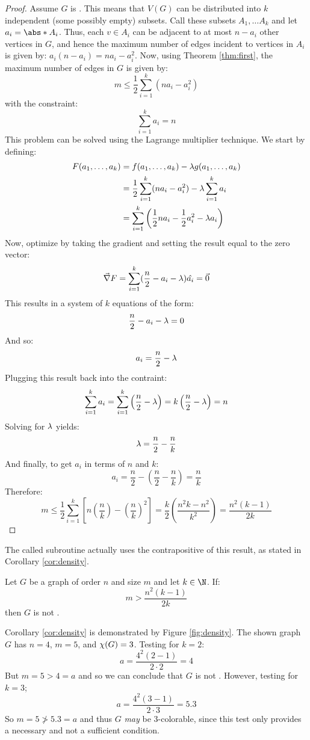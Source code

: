 \begin{proof}
  Assume \(G\) is .  This means that \(V(G)\) can be distributed into \(k\) independent (some possibly
  empty) subsets.  Call these subsets \(A_1,\ldots A_k\) and let \(a_i=\abs*{A_i}\).  Thus, each \(v\in A_i\) can
  be adjacent to at most \(n-a_i\) other vertices in \(G\), and hence the maximum number of edges incident to
  vertices in \(A_i\) is given by: \(a_i(n-a_i)=na_i-a_i^2\).  Now, using Theorem \ref{thm:first}, the maximum
  number of edges in \(G\) is given by:
  \[m\le\frac{1}{2}\sum_{i=1}^k(na_i-a_i^2)\]
  with the constraint:
  \[\sum_{i=1}^ka_i=n\]
  This problem can be solved using the Lagrange multiplier technique.  We start by defining:
  \begin{align*}
    F(a_1,\ldots,a_k) &= f(a_1,\ldots,a_k)-\lambda g(a_1,\ldots,a_k) \\
    &= \frac{1}{2}\sum_{i=1}^k(na_i-a_i^2)-\lambda\sum_{i=1}^ka_i \\
    &= \sum_{i=1}^k\left(\frac{1}{2}na_i-\frac{1}{2}a_i^2-\lambda a_i\right)
  \end{align*}
  Now, optimize by taking the gradient and setting the result equal to the zero vector:
  \[\vec{\nabla}F=\sum_{i=1}^k(\frac{n}{2}-a_i-\lambda)\hat{a_i}=\vec{0}\]
  This results in a system of \(k\) equations of the form:
  \[\frac{n}{2}-a_i-\lambda=0\]
  And so:
  \[a_i=\frac{n}{2}-\lambda\]
  Plugging this result back into the contraint:
  \[\sum_{i=1}^ka_i=\sum_{i=1}^k\left(\frac{n}{2}-\lambda\right)=k\left(\frac{n}{2}-\lambda\right)=n\]
  Solving for \(\lambda\) yields:
  \[\lambda=\frac{n}{2}-\frac{n}{k}\]
  And finally, to get \(a_i\) in terms of \(n\) and \(k\):
  \[a_i=\frac{n}{2}-\left(\frac{n}{2}-\frac{n}{k}\right)=\frac{n}{k}\]
  Therefore:
  \[m\le\frac{1}{2}\sum_{i=1}^k\left[n\left(\frac{n}{k}\right)-\left(\frac{n}{k}\right)^2\right]=
  \frac{k}{2}\left(\frac{n^2k-n^2}{k^2}\right)=\frac{n^2(k-1)}{2k}\]
\end{proof}

The called subroutine actually uses the contrapositive of this result, as stated in Corollary \ref{cor:density}.

\begin{corollary}
  \label{cor:density}
  Let \(G\) be a graph of order \(n\) and size \(m\) and let \(k\in\N\).  If:
  \[m>\frac{n^2(k-1)}{2k}\]
  then \(G\) is not .
\end{corollary}

Corollary \ref{cor:density} is demonstrated by Figure \ref{fig:density}.  The shown graph \(G\) has \(n=4\),
\(m=5\), and \(\chi(G)=3\).  Testing for \(k=2\):
\[a=\frac{4^2(2-1)}{2\cdot2}=4\]
But \(m=5>4=a\) and so we can conclude that \(G\) is not .  However, testing for \(k=3\);
\[a=\frac{4^2(3-1)}{2\cdot3}=5.3\]
So \(m=5\ngtr5.3=a\) and thus \(G\) \emph{may} be \(3\)-colorable, since this test only provides a necessary and
not a sufficient condition.

